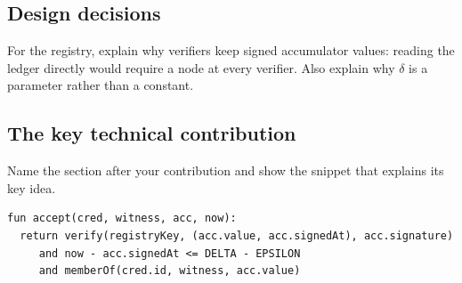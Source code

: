 \subsection{Design decisions}\label{guide:chapters:design-decisions}
For the registry, explain why verifiers keep signed accumulator values: reading the ledger directly would require a node at every verifier. Also explain why $\delta$ is a parameter rather than a constant.

\subsection[The key technical contribution]{The key technical contribution\skimmark}\label{guide:chapters:key-contribution}
Name the section after your contribution and show the snippet that explains its key idea.
\begin{lstlisting}[float=htbp, caption={The verifier authenticates the value and timestamp, reserves $\epsilon$ of the staleness budget for clock error, and checks the membership witness. Here $0\leq\epsilon<\delta$.}, label={lst:guide:key}]
fun accept(cred, witness, acc, now):
  return verify(registryKey, (acc.value, acc.signedAt), acc.signature)
     and now - acc.signedAt <= DELTA - EPSILON
     and memberOf(cred.id, witness, acc.value)
\end{lstlisting}

